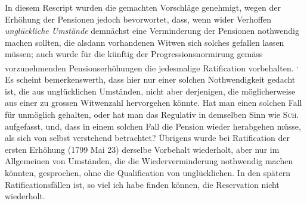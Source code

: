 In diesem Rescript wurden die gemachten Vorschläge genehmigt, wegen der Erhöhung der Pensionen jedoch bevorwortet, dass, wenn wider Verhoffen \textit{unglückliche Umstände} demnächst eine Verminderung der Pensionen nothwendig machen sollten, die alsdann vorhandenen Witwen sich solches gefallen lassen müssen; auch wurde für die künftig der Progressionsnormirung gemäss vorzunehmenden Pensionserhöhungen die jedesmalige Ratification vorbehalten. \textsuperscript{.} Es scheint bemerkenswerth, dass hier nur einer solchen Nothwendigkeit gedacht ist, die aus unglücklichen Umständen, nicht aber derjenigen, die möglicherweise aus einer zu grossen Witwenzahl hervorgehen könnte. Hat man einen solchen Fall für unmöglich gehalten, oder hat man das Regulativ in demselben Sinn wie \textsc{Sch.} aufgefasst, und, dass in einem solchen Fall die Pension wieder herabgehen müsse, als sich von selbst verstehend betrachtet? Übrigens wurde bei Ratification der ersten Erhöhung (1799 Mai 23) derselbe Vorbehalt wiederholt, aber nur im Allgemeinen von Umständen, die die Wiederverminderung nothwendig machen könnten, gesprochen, ohne die Qualification von unglücklichen. In den spätern Ratificationsfällen ist, so viel ich habe finden können, die Reservation nicht wiederholt.
